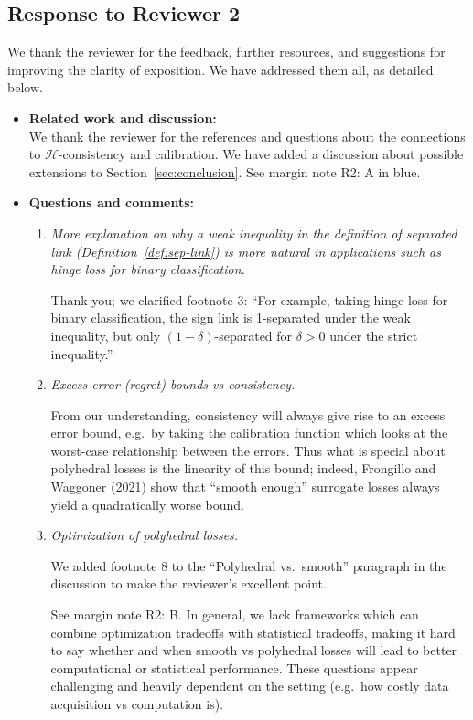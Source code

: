 \documentclass[a4paper]{article}
\begin{document}
\subsection*{Response to Reviewer 2}

We thank the reviewer for the feedback, further resources, and suggestions for improving the clarity of exposition.
We have addressed them all, as detailed below.

\begin{itemize}
\item \textbf{Related work and discussion:}\\
 We thank the reviewer for the references and questions about the connections to $\mathcal{H}$-consistency and calibration. We have added a discussion about possible extensions to Section~\ref{sec:conclusion}. See margin note R2: A in blue.
  
\item \textbf{Questions and comments:}
  \begin{enumerate}
  \item \emph{More explanation on why a weak inequality in the definition of separated link (Definition~\ref{def:sep-link}) is more natural in applications such as hinge loss for binary classification.}

    Thank you; we clarified footnote 3: ``For example, taking hinge loss for binary classification, the sign link is 1-separated under the weak inequality, but only $(1-\delta)$-separated for $\delta > 0$ under the strict inequality.''
    
  \item \emph{Excess error (regret) bounds vs consistency.}

    From our understanding, consistency will always give rise to an excess error bound, e.g.\ by taking the calibration function which looks at the worst-case relationship between the errors.
    Thus what is special about polyhedral losses is the linearity of this bound; indeed, Frongillo and Waggoner (2021) show that ``smooth enough'' surrogate losses always yield a quadratically worse bound.
    
  \item \emph{Optimization of polyhedral losses.}

    We added footnote 8 to the ``Polyhedral vs.\ smooth'' paragraph in the discussion to make the reviewer's excellent point. 

    See margin note R2: B.
    In general, we lack frameworks which can combine optimization tradeoffs with statistical tradeoffs, making it hard to say whether and when smooth vs polyhedral losses will lead to better computational or statistical performance.
    These questions appear challenging and heavily dependent on the setting (e.g.\ how costly data acquisition vs computation is).
    

\end{enumerate}
\end{itemize}
\end{document}
